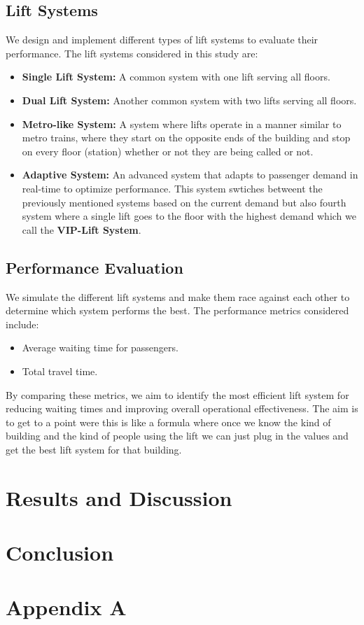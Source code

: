 \documentclass[12pt]{report}
\begin{document}
\subsection{Lift Systems}
We design and implement different types of lift systems to evaluate their performance. The lift systems considered in this study are:
\begin{itemize}
    \item \textbf{Single Lift System:} A common system with one lift serving all floors.
    \item \textbf{Dual Lift System:} Another common system with two lifts serving all floors.
    \item \textbf{Metro-like System:} A system where lifts operate in a manner similar to metro trains, where they start on the opposite ends of the building and stop on every floor (station) whether or not they are being called or not.
    \item \textbf{Adaptive System:} An advanced system that adapts to passenger demand in real-time to optimize performance. This system swtiches betweent the previously mentioned systems based on the current demand but also fourth system where a single lift goes to the floor with the highest demand which we call the \textbf{VIP-Lift System}.
\end{itemize}

\subsection{Performance Evaluation}
We simulate the different lift systems and make them race against each other to determine which system performs the best. The performance metrics considered include:
\begin{itemize}
    \item Average waiting time for passengers.
    \item Total travel time.
\end{itemize}
By comparing these metrics, we aim to identify the most efficient lift system for reducing waiting times and improving overall operational effectiveness. The aim is to get to a point were this is like a formula where once we know the kind of building and the kind of people using the lift we can just plug in the values and get the best lift system for that building.


\pagebreak
\section{Results and Discussion}
\label{chap:results}



\pagebreak
\section{Conclusion}
\label{chap:conclusion}

\pagebreak


\pagebreak
\appendix
\section*{Appendix A}
\label{chap:appendixA}
\end{document}
